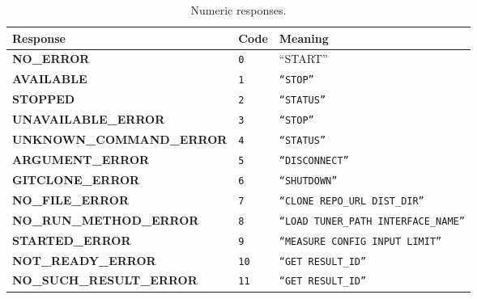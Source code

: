 
\begin{table}[htpb]
    \centering
    \tiny
    \begin{tabular}{@{}KTL@{}}
        \toprule
        {\bf Response} & {\bf Code} & {\bf Meaning} \\ \midrule
        {\tiny \bf NO\_ERROR} & 
        {\tiny \tt 0} & 
        {\tiny ``START''} \\ \midrule
        {\tiny \bf AVAILABLE} & 
        {\tiny \tt 1} & 
        {\tiny \tt ``STOP''} \\ \midrule
        {\tiny \bf STOPPED} & 
        {\tiny \tt 2} & 
        {\tiny \tt ``STATUS''} \\ \midrule
        {\tiny \bf UNAVAILABLE\_ERROR} & 
        {\tiny \tt 3} & 
        {\tiny \tt ``STOP''} \\ \midrule
        {\tiny \bf UNKNOWN\_COMMAND\_ERROR} & 
        {\tiny \tt 4} & 
        {\tiny \tt ``STATUS''} \\ \midrule
        {\tiny \bf ARGUMENT\_ERROR} & 
        {\tiny \tt 5} & 
        {\tiny \tt ``DISCONNECT''} \\ \midrule
        {\tiny \bf GITCLONE\_ERROR} & 
        {\tiny \tt 6} & 
        {\tiny \tt ``SHUTDOWN''} \\ \midrule
        {\tiny \bf NO\_FILE\_ERROR} & 
        {\tiny \tt 7} & 
        {\tiny \tt ``CLONE REPO\_URL DIST\_DIR''} \\ \midrule
        {\tiny \bf NO\_RUN\_METHOD\_ERROR} & 
        {\tiny \tt 8} & 
        {\tiny \tt ``LOAD TUNER\_PATH INTERFACE\_NAME''} \\ \midrule
        {\tiny \bf STARTED\_ERROR} & 
        {\tiny \tt 9} & 
        {\tiny \tt ``MEASURE CONFIG INPUT LIMIT''} \\ \midrule
        {\tiny \bf NOT\_READY\_ERROR} & 
        {\tiny \tt 10} & 
        {\tiny \tt ``GET RESULT\_ID''} \\ \midrule
        {\tiny \bf NO\_SUCH\_RESULT\_ERROR} & 
        {\tiny \tt 11} & 
        {\tiny \tt ``GET RESULT\_ID''} \\ \bottomrule
    \end{tabular}
    \caption{Numeric responses.}
    \label{tab:protocol-errors}
\end{table}
